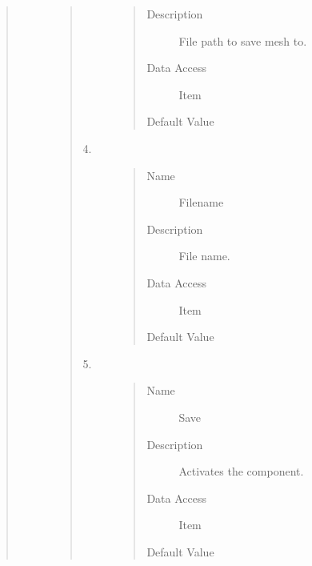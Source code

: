 \documentclass[letterpaper,10pt,english]{sphinxmanual}
\begin{document}
\begin{quote}
\begin{description}
\begin{quote}
\begin{description}
\begin{quote}
\begin{description}
\item[{Description}] \leavevmode
File path to save mesh to.

\item[{Data Access}] \leavevmode
Item

\item[{Default Value}] \leavevmode
{}

\end{description}\end{quote}

\item[{4.}] \leavevmode\begin{quote}\begin{description}
\item[{Name}] \leavevmode
Filename

\item[{Description}] \leavevmode
File name.

\item[{Data Access}] \leavevmode
Item

\item[{Default Value}] \leavevmode
{}

\end{description}\end{quote}

\item[{5.}] \leavevmode\begin{quote}\begin{description}
\item[{Name}] \leavevmode
Save

\item[{Description}] \leavevmode
Activates the component.

\item[{Data Access}] \leavevmode
Item

\item[{Default Value}] \leavevmode
{}

\end{description}\end{quote}


\end{description}
\end{quote}
\end{description}
\end{quote}
\end{document}
